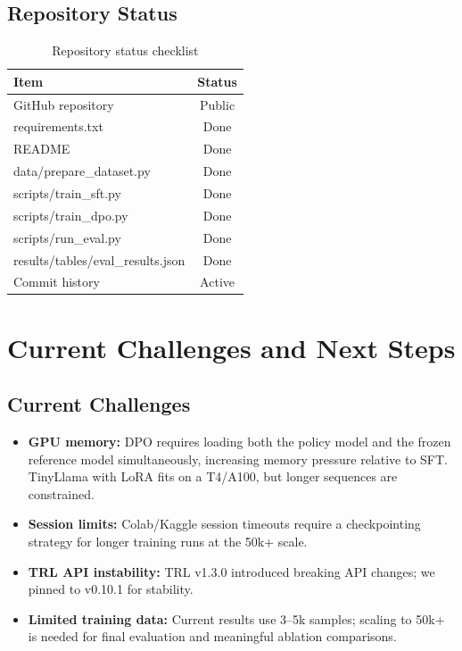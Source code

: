 \documentclass[12pt,a4paper]{article}
\begin{document}
\subsection*{Repository Status}

\begin{table}[h]
\centering
\begin{tabular}{>{\ttfamily}lc}
\toprule
\textbf{Item} & \textbf{Status} \\
\midrule
\normalfont GitHub repository   & Public \\
requirements.txt                & Done \\
\normalfont README              & Done \\
data/prepare\_dataset.py        & Done \\
scripts/train\_sft.py           & Done \\
scripts/train\_dpo.py           & Done \\
scripts/run\_eval.py            & Done \\
results/tables/eval\_results.json & Done \\
\normalfont Commit history      & Active \\
\bottomrule
\end{tabular}
\caption{Repository status checklist}
\end{table}

\section{Current Challenges and Next Steps}

\subsection*{Current Challenges}

\begin{itemize}[noitemsep]
    \item \textbf{GPU memory:} DPO requires loading both the policy model and the
          frozen reference model simultaneously, increasing memory pressure relative
          to SFT. TinyLlama with LoRA fits on a T4/A100, but longer sequences are
          constrained.
    \item \textbf{Session limits:} Colab/Kaggle session timeouts require a
          checkpointing strategy for longer training runs at the 50k+ scale.
    \item \textbf{TRL API instability:} TRL v1.3.0 introduced breaking API changes;
          we pinned to v0.10.1 for stability.
    \item \textbf{Limited training data:} Current results use 3--5k samples; scaling
          to 50k+ is needed for final evaluation and meaningful ablation comparisons.
\end{itemize}
\end{document}
